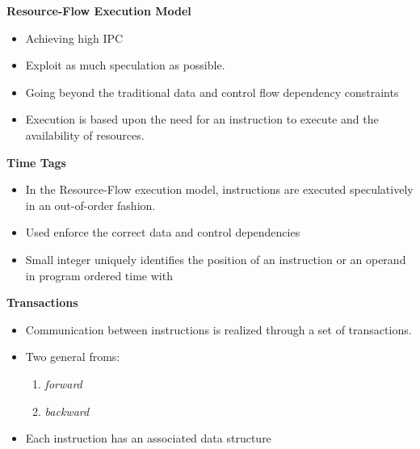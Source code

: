 \documentclass[12pt]{slides}
\begin{document}
%
\parskip 2mm
%
%
%
%
%

\begin{slide}
\begin{center}
\textbf {Resource-Flow Execution Model}
\end{center}
%
\begin{itemize}
%
\item Achieving high IPC
%
\item Exploit as much speculation as possible.  
%
\item Going beyond the traditional data and control flow dependency constraints 

\item Execution is based upon the need for an instruction to execute and
the availability of resources.  

\end{itemize}
\end{slide}




\begin{slide}
\begin{center}
\textbf {Time Tags}
\end{center}
%
\begin{itemize}
%

\item In the Resource-Flow execution model, instructions are executed
speculatively in an out-of-order fashion.  

\item Used enforce the correct data and control dependencies 

\item Small integer uniquely identifies the position of an instruction or an
operand in program ordered time with 

\end{itemize}
\end{slide}



\begin{slide}
\begin{center}
\textbf {Transactions}
\end{center}
%
\begin{itemize}
%
\item Communication between instructions is realized through a set of
transactions. 
%
\item
Two general froms: 
\begin{enumerate}
\item \emph{forward} 
\item \emph{backward}
\end{enumerate}
%
\item Each instruction has an associated data structure 

%
\end{itemize}
\end{slide}
\end{document}
